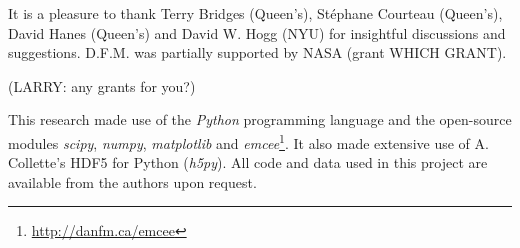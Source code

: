 \documentclass[preprint,12pt]{aastex}
\newcommand{\project}[1]{\emph{#1}}
\begin{document}














\acknowledgments It is a pleasure to thank Terry Bridges (Queen's),
St\'ephane Courteau (Queen's), David Hanes (Queen's) and David W. Hogg (NYU)
for insightful discussions and suggestions. D.F.M. was partially supported
by NASA (grant WHICH GRANT).

(LARRY: any grants for you?)

This research made use of the \project{Python} programming language and the
open-source modules \project{scipy}, \project{numpy}, \project{matplotlib}
and \project{emcee}\footnote{\url{http://danfm.ca/emcee}}.  It also
made extensive use of A. Collette's HDF5 for Python (\project{h5py}). All
code and data used in this project are available from the authors upon
request.



\end{document}
